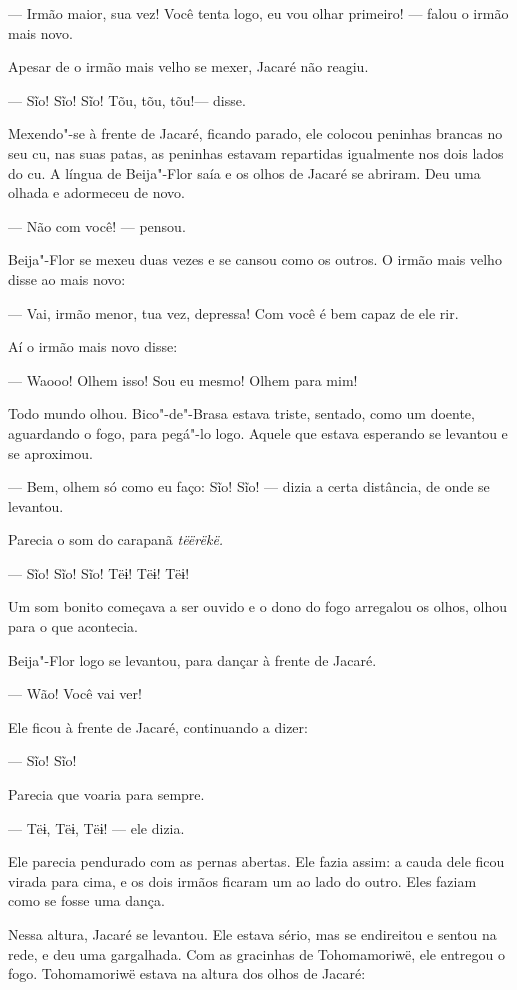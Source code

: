 --- Irmão maior, sua vez! Você tenta logo, eu vou olhar primeiro! ---
falou o irmão mais novo. 

Apesar de o irmão mais velho se mexer, Jacaré não reagiu.

--- Sĩo! Sĩo! Sĩo! Tõu, tõu, tõu!--- disse.

Mexendo"-se à frente de Jacaré, ficando parado, ele colocou peninhas
brancas no seu cu, nas suas patas, as peninhas estavam repartidas
igualmente nos dois lados do cu. A língua de Beija"-Flor saía e os
olhos de Jacaré se abriram. Deu uma olhada e adormeceu de novo. 

--- Não com você! --- pensou. 

Beija"-Flor se mexeu duas vezes e se cansou como os outros.
O irmão mais velho disse ao mais novo: 

--- Vai, irmão menor, tua vez, depressa! Com você é bem capaz de ele
rir.

Aí o irmão mais novo disse:

--- Waooo! Olhem isso! Sou eu mesmo! Olhem para mim! 

Todo mundo olhou. Bico"-de"-Brasa estava triste, sentado, como um
doente, aguardando o fogo, para pegá"-lo logo. Aquele que estava esperando
se levantou e se aproximou. 

--- Bem, olhem só como eu faço: Sĩo! Sĩo! --- dizia a certa
distância, de onde se levantou. 

Parecia o som do carapanã \emph{tëërëkë.}

--- Sĩo! Sĩo! Sĩo! Tëɨ! Tëɨ! Tëɨ!

Um som bonito começava a ser ouvido e o dono do fogo arregalou os olhos,
olhou para o que acontecia.

Beija"-Flor logo se levantou, para dançar à frente de Jacaré.

--- Wão! Você vai ver!

Ele ficou à frente de Jacaré, continuando a dizer:

--- Sĩo! Sĩo!

Parecia que voaria para sempre. 


--- Tëɨ, Tëɨ, Tëɨ! --- ele dizia. 

Ele parecia pendurado com as pernas abertas. Ele fazia assim: a cauda
dele ficou virada para cima, e os dois irmãos ficaram um ao lado do
outro. Eles faziam como se fosse uma dança. 


Nessa altura, Jacaré se levantou. Ele estava sério, mas se endireitou e
sentou na rede, e deu uma gargalhada. Com as gracinhas de Tohomamoriwë,
ele entregou o fogo. Tohomamoriwë estava na altura dos olhos de Jacaré: 

